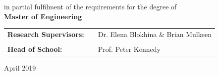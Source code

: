 \documentclass[11pt,british]{report}
\begin{document}
\begin{titlepage}
\begin{center}
{		in partial fulfilment of the requirements for the degree of \\ \vspace{0.5cm}
		\textbf{Master of Engineering} }
	\end{center}
	\vspace{1.cm}
	{\Large{}\bigskip{}
	\bigskip{}
	}{\Large \par}
	\noindent
	\begin{center}
		\begin{tabular}{lll}
			\textbf{\large{}Research Supervisors:} & \qquad{}\qquad{} & {\large{}Dr. Elena Blokhina \& Brian Mulkeen}\\
			&  & \\
			\textbf{\large{}Head of School:} & \qquad{}\qquad{} & {\large{}Prof. Peter Kennedy}\\
		\end{tabular}
	\par\end{center}
	
	\vspace{1cm}
	\noindent
	\begin{center}
		{\large{}April 2019}
		\par
	\end{center}{\large \par}
\end{titlepage}



\setcounter{page}{1} 
{}
\fancyhead{}

\tableofcontents{}
\listoffigures
\listoftables

\pagebreak{}



\end{document}
